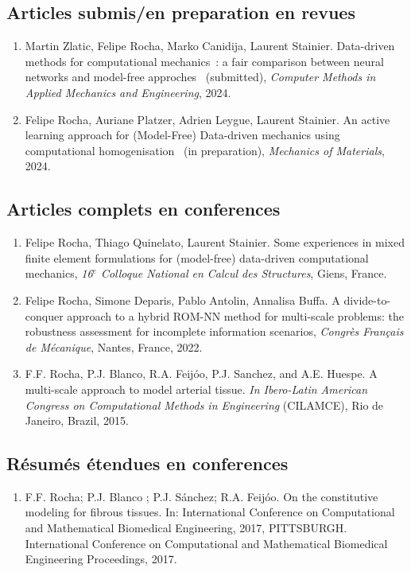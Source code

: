 \documentclass[french]{article}
\begin{document}
\subsection*{Articles submis/en preparation en revues}
\begin{enumerate}
\item Martin Zlatic, Felipe Rocha, Marko Canidija, Laurent Stainier. Data-driven methods for computational mechanics : a fair comparison between neural networks and model-free approches  (submitted), \textit{Computer Methods in Applied Mechanics and Engineering}, 2024.
\item Felipe Rocha, Auriane Platzer, Adrien Leygue, Laurent Stainier. An active learning approach for (Model-Free) Data-driven mechanics using computational homogenisation  (in preparation), \textit{Mechanics of Materials}, 2024.
\end{enumerate}
\subsection*{Articles complets en conferences} 
\begin{enumerate}
	\item Felipe Rocha, Thiago Quinelato, Laurent Stainier. Some experiences in mixed finite element formulations for (model-free) data-driven computational mechanics, \textit{16$^{e}$ Colloque National en Calcul des Structures}, Giens, France.
	\item Felipe Rocha, Simone Deparis, Pablo Antolin, Annalisa Buffa. 
	A divide-to-conquer approach to a hybrid ROM-NN method for multi-scale problems: the robustness assessment for incomplete information scenarios, \textit{Congrès Français de Mécanique}, Nantes, France, 2022.
	\item F.F. Rocha, P.J. Blanco, R.A. Feijóo, P.J. Sanchez, and A.E. Huespe. A multi-scale approach to model arterial tissue. \textit{In Ibero-Latin American Congress on Computational Methods in Engineering} (CILAMCE), Rio
	de Janeiro, Brazil, 2015.
\end{enumerate}	
\subsection*{Résumés étendues en conferences}
\begin{enumerate}
	\item F.F. Rocha; P.J. Blanco ; P.J. Sánchez; R.A. Feijóo. On the constitutive modeling for fibrous tissues. In: International Conference on Computational and Mathematical Biomedical Engineering, 2017, PITTSBURGH. International Conference on Computational and Mathematical Biomedical Engineering Proceedings, 2017.
\end{enumerate}
\end{document}
